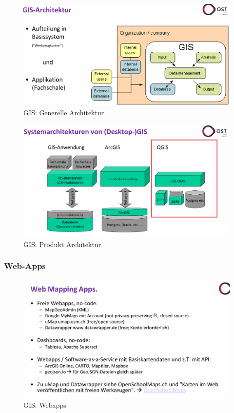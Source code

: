 \documentclass[../Main.tex]{subfiles}
\begin{document}
\begin{figure}[H]
    \centering
    \includegraphics[width=0.75\linewidth]{Images/gis-architektur.png}
    \caption{GIS: Generelle Architektur}
\end{figure}
\begin{figure}[H]
    \centering
    \includegraphics[width=1\linewidth]{Images/gis-architekturen.png}
    \caption{GIS: Produkt Architektur}
\end{figure}

\subsubsection{Web-Apps}
\begin{figure}[H]
    \centering
    \includegraphics[width=0.75\linewidth]{Images/gis-webapps.png}
    \caption{GIS: Webapps}
\end{figure}
\end{document}
